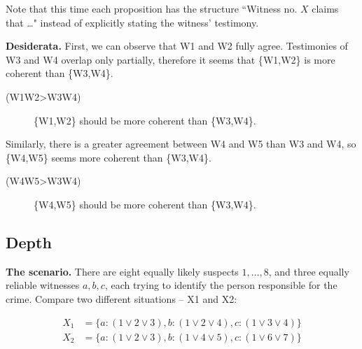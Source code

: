 \documentclass[10pt,]{scrartcl}
\newcommand{\s}[1]{\mbox{\textsf{#1}}}
\begin{document}
Note that this time each proposition has the structure ``Witness no.
\(X\) claims that \dots" instead of explicitly stating the witness'
testimony.

\textbf{Desiderata.} First, we can observe that \s{W1} and \s{W2} fully
agree. Testimonies of \s{W3} and \s{W4} overlap only partially,
therefore it seems that \{\s{W1},\s{W2}\} is more coherent than
\{\s{W3},\s{W4}\}. \vspace{2mm}

\begin{description}
    \item[(\s{W1W2\textgreater W3W4})] \{\s{W1},\s{W2}\} should be more coherent than \{\s{W3},\s{W4}\}.
\end{description}

\vspace{2mm}

Similarly, there is a greater agreement between \s{W4} and \s{W5} than
\s{W3} and \s{W4}, so \{\s{W4},\s{W5}\} seems more coherent than
\{\s{W3},\s{W4}\}. \vspace{2mm}

\begin{description}
    \item[(\s{W4W5\textgreater W3W4})] \{\s{W4},\s{W5}\} should be more coherent than \{\s{W3},\s{W4}\}.
\end{description}

\vspace{2mm}

\subsection{Depth}

\textbf{The scenario.} There are eight equally likely suspects
\(1, \dots, 8\), and three equally reliable witnesses \(a, b, c\), each
trying to identify the person responsible for the crime. Compare two
different situations -- \s{X1} and \s{X2}:

\begin{align*}
    X_1 & = \{a:(1 \vee 2 \vee 3), b:(1\vee 2 \vee 4), c:(1 \vee 3 \vee 4)\}\\
    X_2 & =  \{a:(1 \vee 2 \vee 3), b:(1\vee  4 \vee 5), c:(1 \vee 6 \vee 7)\}\\
\end{align*}
\end{document}
